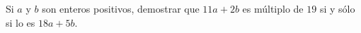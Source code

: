 Si $a$ y $b$ son enteros positivos, demostrar que $11a+2b$ es múltiplo de $19$ si y sólo si lo es $18a+5b$.
